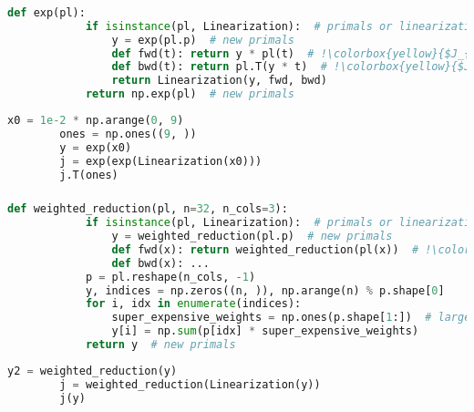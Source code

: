 \documentclass[aspectratio=169,xcolor=dvipsnames]{beamer}
\begin{document}
\begin{frame}[fragile]
	\frametitle{\insertsection}
	\framesubtitle{\insertsubsection}

	\begin{lstlisting}[language=python,escapechar=!]
		def exp(pl):
			if isinstance(pl, Linearization):  # primals or linearization
				y = exp(pl.p)  # new primals
				def fwd(t): return y * pl(t)  # !\colorbox{yellow}{$J_{\exp,\mathrm{pl.p}} \cdot J_\mathrm{pl} \cdot t$}!
				def bwd(t): return pl.T(y * t)  # !\colorbox{yellow}{$J^\dagger_\mathrm{pl} \cdot J^\dagger_{\exp,\mathrm{pl.p}} \cdot t$}!
				return Linearization(y, fwd, bwd)
			return np.exp(pl)  # new primals
	\end{lstlisting}

	\pause
	\begin{lstlisting}[language=python,escapechar=!]
		x0 = 1e-2 * np.arange(0, 9)
		ones = np.ones((9, ))
		y = exp(x0)
		j = exp(exp(Linearization(x0)))
		j.T(ones)
	\end{lstlisting}

\end{frame}

\begin{frame}[fragile]
	\frametitle{\insertsection}
	\framesubtitle{\insertsubsection}

	\begin{lstlisting}[language=python,escapechar=!]
		def weighted_reduction(pl, n=32, n_cols=3):
			if isinstance(pl, Linearization):  # primals or linearization
				y = weighted_reduction(pl.p)  # new primals
				def fwd(x): return weighted_reduction(pl(x))  # !\colorbox{yellow}{ref. to self}!
				def bwd(x): ...
			p = pl.reshape(n_cols, -1)
			y, indices = np.zeros((n, )), np.arange(n) % p.shape[0]
			for i, idx in enumerate(indices):
				super_expensive_weights = np.ones(p.shape[1:])  # large weights
				y[i] = np.sum(p[idx] * super_expensive_weights)
			return y  # new primals
	\end{lstlisting}

	\pause
	\begin{lstlisting}[language=python,escapechar=!]
		y2 = weighted_reduction(y)
		j = weighted_reduction(Linearization(y))
		j(y)
	\end{lstlisting}

\end{frame}
\end{document}
